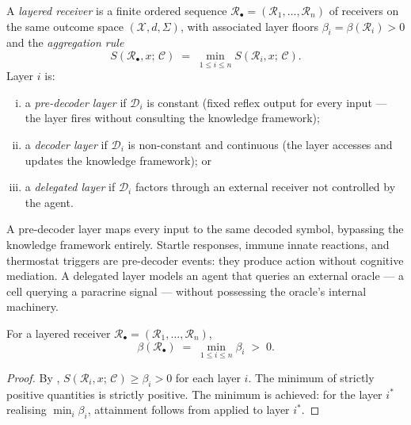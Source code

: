 \begin{definition}
\label{def:layered-full}
A \emph{layered receiver} is a finite ordered sequence $\mathcal{R}_\bullet
= (\mathcal{R}_1, \ldots, \mathcal{R}_n)$ of receivers on the same outcome
space $(\mathcal{X}, d, \Sigma)$, with associated layer floors $\beta_i =
\beta(\mathcal{R}_i) > 0$ and the \emph{aggregation rule}
\[
  S(\mathcal{R}_\bullet, x;\, \mathcal{C})
  \;=\; \min_{1 \leq i \leq n} S(\mathcal{R}_i, x;\, \mathcal{C}) .
\]
Layer $i$ is:
\begin{enumerate}[(i)]
  \item a \emph{pre-decoder layer} if $\mathcal{D}_i$ is constant (fixed
    reflex output for every input — the layer fires without consulting the
    knowledge framework);
  \item a \emph{decoder layer} if $\mathcal{D}_i$ is non-constant and
    continuous (the layer accesses and updates the knowledge framework); or
  \item a \emph{delegated layer} if $\mathcal{D}_i$ factors through an
    external receiver not controlled by the agent.
\end{enumerate}
\end{definition}

\begin{remark}
\label{rem:reflex-layers}
A pre-decoder layer maps every input to the same decoded symbol, bypassing
the knowledge framework entirely.  Startle responses, immune innate reactions,
and thermostat triggers are pre-decoder events: they produce action without
cognitive mediation.  A delegated layer models an agent that queries an
external oracle — \eg a cell querying a paracrine signal — without possessing
the oracle's internal machinery.
\end{remark}

\begin{proposition}
\label{prop:layered-floor-full}
For a layered receiver $\mathcal{R}_\bullet = (\mathcal{R}_1, \ldots,
\mathcal{R}_n)$,
\[
  \beta(\mathcal{R}_\bullet)
  \;=\; \min_{1 \leq i \leq n} \beta_i \;>\; 0 .
\]
\end{proposition}

\begin{proof}
By , $S(\mathcal{R}_i, x;\, \mathcal{C}) \geq
\beta_i > 0$ for each layer $i$.  The minimum of strictly positive quantities
is strictly positive.  The minimum is achieved: for the layer $i^*$ realising
$\min_i \beta_i$, attainment follows from 
applied to layer $i^*$.
\end{proof}

